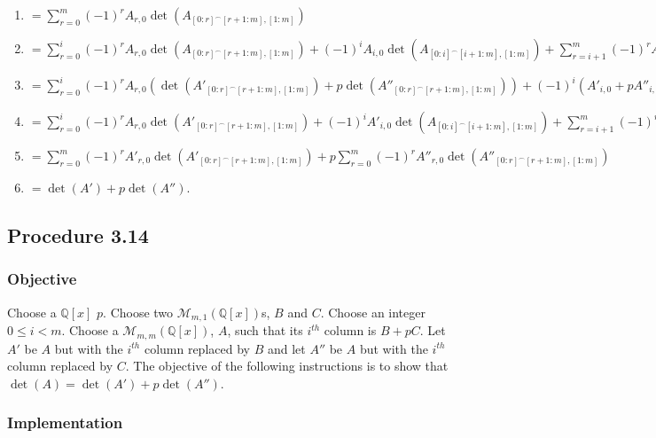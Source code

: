 \documentclass[twocolumn]{article}
\newcommand{\procedure}[2][]{\subsection*{Procedure #2 \ifthenelse{\equal{#1}{}}{}{(#1)}}\label{sec:procedure #2}}
\newcommand{\objective}{\subsubsection*{Objective}}
\newcommand{\implementation}{\subsubsection*{Implementation}}
\begin{document}
\begin{enumerate}
\begin{enumerate}
						\begin{enumerate}
							\item $=\sum_{r=0}^m (-1)^rA_{r,0}\det(A_{[0:r]^\frown[r+1:m],[1:m]})$
							\item $=\sum_{r=0}^i (-1)^rA_{r,0}\det(A_{[0:r]^\frown[r+1:m],[1:m]})+(-1)^iA_{i,0}\det(A_{[0:i]^\frown[i+1:m],[1:m]})+\sum_{r=i+1}^m (-1)^rA_{r,0}\det(A_{[0:r]^\frown[r+1:m],[1:m]})$
							\item $=\sum_{r=0}^i (-1)^rA_{r,0}(\det(A'_{[0:r]^\frown[r+1:m],[1:m]})+p\det(A''_{[0:r]^\frown[r+1:m],[1:m]}))+(-1)^i(A'_{i,0}+pA''_{i,0})\det(A_{[0:i]^\frown[i+1:m],[1:m]})+\sum_{r=i+1}^m (-1)^rA_{r,0}(\det(A'_{[0:r]^\frown[r+1:m],[1:m]})+p\det(A''_{[0:r]^\frown[r+1:m],[1:m]}))$
							\item $=\sum_{r=0}^i (-1)^rA_{r,0}\det(A'_{[0:r]^\frown[r+1:m],[1:m]})+(-1)^iA'_{i,0}\det(A_{[0:i]^\frown[i+1:m],[1:m]})+\sum_{r=i+1}^m (-1)^rA_{r,0}\det(A'_{[0:r]^\frown[r+1:m],[1:m]})
								+\sum_{r=0}^i (-1)^rA_{r,0}p\det(A''_{[0:r]^\frown[r+1:m],[1:m]})+(-1)^ipA''_{i,0}\det(A_{[0:i]^\frown[i+1:m],[1:m]})+\sum_{r=i+1}^m (-1)^rA_{r,0}p\det(A''_{[0:r]^\frown[r+1:m],[1:m]})$
							\item $=\sum_{r=0}^m (-1)^rA'_{r,0}\det(A'_{[0:r]^\frown[r+1:m],[1:m]})+p\sum_{r=0}^m (-1)^rA''_{r,0}\det(A''_{[0:r]^\frown[r+1:m],[1:m]})$
							\item $=\det(A')+p\det(A'')$.
						\end{enumerate}
					\end{enumerate}
				\end{enumerate}
		\procedure{3.14}
			\objective
				Choose a $\mathbb{Q}[x]$ $p$. Choose two $\mathcal{M}_{m,1}(\mathbb{Q}[x])$s, $B$ and $C$. Choose an integer $0\le i<m$. Choose a $\mathcal{M}_{m,m}(\mathbb{Q}[x])$, $A$, such that its $i^{th}$ column is $B+pC$. Let $A'$ be $A$ but with the $i^{th}$ column replaced by $B$ and let $A''$ be $A$ but with the $i^{th}$ column replaced by $C$. The objective of the following instructions is to show that $\det(A)=\det(A')+p\det(A'')$.
			\implementation
\end{document}
